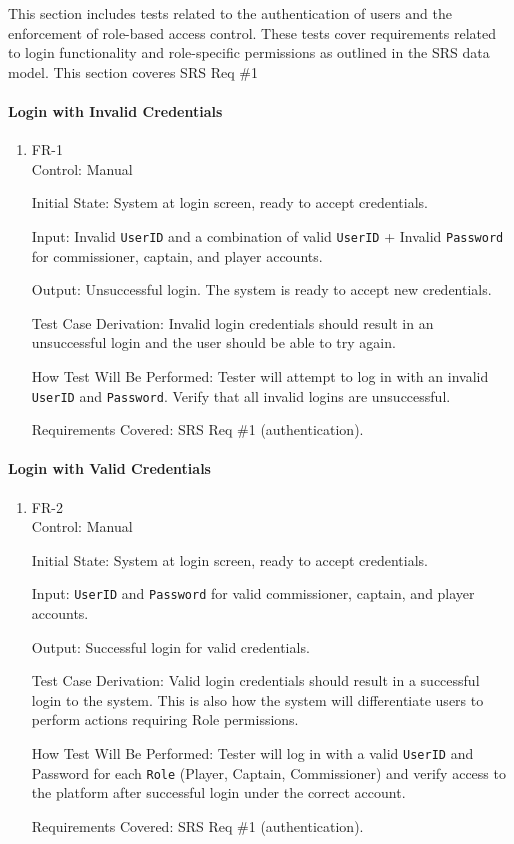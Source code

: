 \documentclass[12pt, titlepage]{article}
\begin{document}
This section includes tests related to the authentication of users and the enforcement of role-based access control. These tests cover requirements related to login functionality and role-specific permissions as outlined in the SRS data model. This section coveres SRS Req \#1

\paragraph{Login with Invalid Credentials}

\begin{enumerate}
  \item{FR-1\\}
        Control: Manual

        Initial State: System at login screen, ready to accept credentials.

        Input: Invalid \texttt{UserID} and a combination of valid \texttt{UserID} + Invalid \texttt{Password} for commissioner, captain, and player accounts.

        Output: Unsuccessful login. The system is ready to accept new credentials.

        Test Case Derivation: Invalid login credentials should result in an unsuccessful login and the user should be able to try again.

        How Test Will Be Performed: Tester will attempt to log in with an invalid \texttt{UserID} and \texttt{Password}. Verify that all invalid logins are unsuccessful.

        Requirements Covered: SRS Req \#1 (authentication).
\end{enumerate}

\paragraph{Login with Valid Credentials}

\begin{enumerate}

  \item{FR-2\\}
        Control: Manual

        Initial State: System at login screen, ready to accept credentials.

        Input: \texttt{UserID} and \texttt{Password} for valid commissioner, captain, and player accounts.

        Output: Successful login for valid credentials.

        Test Case Derivation: Valid login credentials should result in a successful login to the system. This is also how the system will differentiate users to perform actions requiring Role permissions.

        How Test Will Be Performed: Tester will log in with a valid \texttt{UserID} and Password for each \texttt{Role} (Player, Captain, Commissioner) and verify access to the platform after successful login under the correct account.

        Requirements Covered: SRS Req \#1 (authentication).
\end{enumerate}
\end{document}
